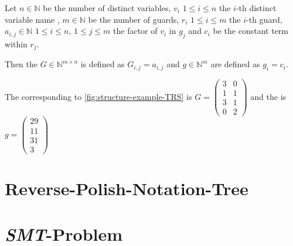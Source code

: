 \begin{definition}
	Let $n \in \mathbb{N}$ be the number of distinct variables, $v_i$ $1 \le i \le n$ the $i$-th distinct variable name , $m \in \mathbb{N}$ be the number of guards, $r_i$ $1 \le i \le m$ the $i$-th guard, $a_{i,j} \in \mathbb{N}$ $1\le i \le n$, $1 \le j \le m$ the factor of $v_i$ in $g_j$ and $c_i$ be the constant term within $r_j$. \newline
		
	Then the \guardmatrix $G \in \mathbb{N}^{m\times n}$ is defined as $G_{i,j}=a_{i,j} $ and \guardconstants $g \in \mathbb{N}^m$ are defined as $g_i = c_i$.
\end{definition}
\begin{example}
	The corresponding \guardmatrix to \autoref{fig:structure-example-TRS} is $G = \begin{pmatrix} 3 & 0 \\ 1 & 1 \\ 3 & 1 \\ 0 & 2 \end{pmatrix}$ and the \guardconstants is $g= \begin{pmatrix} 29 \\ 11 \\ 31 \\ 3 \end{pmatrix}$
\end{example}



\section{Reverse-Polish-Notation-Tree}

\section{\emph{SMT}-Problem}

